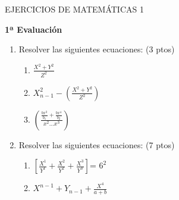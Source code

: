 \documentclass[10pt,a4paper]{article}
\begin{document}
\begin{center}
\LARGE \textcolor[rgb]{1,0,0}{EJERCICIOS DE MATEMÁTICAS 1}
\end{center}
\bigskip
\begin{center}
\Large \bf1ª Evaluación
\end{center}
\begin{flushleft}
\begin{enumerate}
\item \large Resolver las siguientes ecuaciones: \textcolor[rgb]{0,0,1}{(3 ptos)}
	\begin{enumerate}
	\item \large $\frac{X^2+Y^2}{Z^2}$
	\item \large $X^2_{n-1} - \left(\frac{X^2+Y^2}{Z^2}\right)$
	\item \large $\left(\frac{\frac{bx^3}{b_1}+\frac{bx^4}{b_2}}{x^2...x^3}		 \right)$
	\end{enumerate}
\item \large Resolver las siguientes ecuaciones: \textcolor[rgb]{0,0,1}{(7 ptos)}
	\begin{enumerate}
	\item $\left[\frac{X^1}{Y^1}+\frac{X^2}{Y^2}+\frac{X^3}{Y^3}\right]$= $6^2$
	\item $X^{n-1}+Y_{n-1}+\frac{X^4}{a+b}$
	\end{enumerate}
\end{enumerate}
\end{flushleft}
\end{document}
